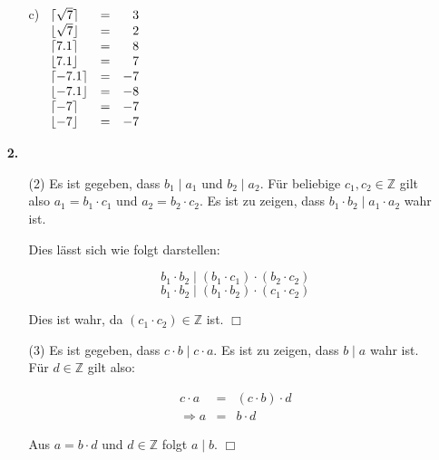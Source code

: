\documentclass[a4paper,10pt]{scrartcl}
\begin{document}
\begin{enumerate}
\begin{enumerate}
            \item[c)]
                $\begin{array}[t]{lcr}
                    \lceil\sqrt{7}\rceil    &=& 3\\
                    \lfloor\sqrt{7}\rfloor  &=& 2\\
                    \lceil7.1\rceil     &=& 8\\
                    \lfloor7.1\rfloor   &=& 7\\
                    \lceil-7.1\rceil    &=& -7\\
                    \lfloor-7.1\rfloor  &=& -8\\
                    \lceil-7\rceil      &=& -7\\
                    \lfloor-7\rfloor    &=& -7\\
                \end{array}$
        \end{enumerate}

    \newpage
    \item[\textbf{2.}]
        \begin{enumerate}
            \item[(2)]
                Es ist gegeben, dass $b_1 \mid a_1$ und $b_2 \mid a_2$. Für beliebige $c_1, c_2 \in \mathbb{Z}$
                gilt also $a_1 = b_1 \cdot c_1$ und $a_2 = b_2 \cdot c_2$. Es ist zu zeigen, dass
                $b_1 \cdot b_2 \mid a_1 \cdot a_2$ wahr ist.

                Dies lässt sich wie folgt darstellen:

                $$b_1 \cdot b_2 \mid (b_1 \cdot c_1) \cdot (b_2 \cdot c_2)$$
                $$b_1 \cdot b_2 \mid (b_1 \cdot b_2) \cdot (c_1 \cdot c_2)$$

                Dies ist wahr, da $(c_1 \cdot c_2) \in \mathbb{Z}$ ist. $\Box$

            \item[(3)]
                Es ist gegeben, dass $c \cdot b \mid c \cdot a$. Es ist zu zeigen, dass $b \mid a$ wahr ist.
                Für $d \in \mathbb{Z}$ gilt also:

                $$\begin{array}{rcl}
                    c \cdot a &=& (c \cdot b) \cdot d\\
                    \Rightarrow a &=& b \cdot d
                \end{array}$$

                Aus $a = b \cdot d$ und $d \in \mathbb{Z}$ folgt $a \mid b$. $\Box$


\end{enumerate}
\end{enumerate}
\end{document}
